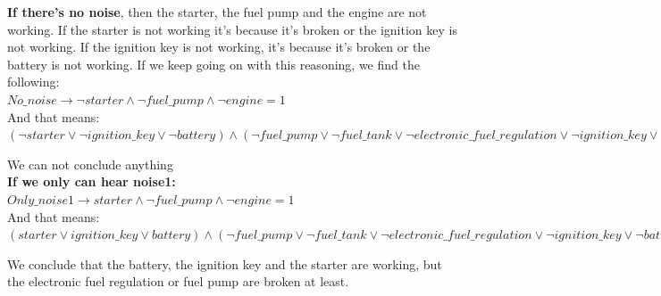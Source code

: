 \documentclass[paper=a4, fontsize=11pt]{scrartcl} %
\numberwithin{equation}{section} %
\numberwithin{figure}{section} %
\numberwithin{table}{section} %
\begin{document}
 \textbf{If there's no noise}, then the starter, the fuel pump and the engine are not working. If the starter is not working it's because it's broken or the ignition key is not working. If the ignition key is not working, it's because it's broken or the battery is not working. If we keep going on with this reasoning, we find the following:\\
		
		$ No\_noise \rightarrow \lnot starter \land \lnot fuel\_pump \land \lnot engine = 1 $\\
		
		And that means: \\
		
		$ (\lnot starter \lor \lnot ignition\_key \lor \lnot battery) \land (\lnot fuel\_pump \lor \lnot fuel\_tank \lor \lnot electronic\_fuel\_regulation \lor \lnot ignition\_key \lor \lnot battery) \land (\lnot engine \lor \lnot filter \lor \lnot fuel\_pump \lor \lnot fuel\_tank \lor \lnot electronic\_fuel\_regulation \lor \lnot ignition\_key \lor \lnot battery \lor \lnot starter \lor \lnot ignition\_key \lor \lnot battery) = 1 $
		
			
		We can not conclude anything\\
		
		
		
		
		
\textbf{If we only can hear noise1:}\\
		
		$ Only\_noise1 \rightarrow  starter \land \lnot fuel\_pump \land \lnot engine = 1 $\\
		
		And that means: \\
		
	$ (starter \lor ignition\_key \lor battery) \land (\lnot fuel\_pump \lor \lnot fuel\_tank \lor \lnot electronic\_fuel\_regulation \lor \lnot ignition\_key \lor \lnot battery) \land (\lnot engine \lor \lnot filter \lor \lnot fuel\_pump \lor \lnot fuel\_tank \lor \lnot electronic\_fuel\_regulation \lor \lnot ignition\_key \lor \lnot battery \lor \lnot starter \lor \lnot ignition\_key \lor \lnot battery) = 1 $
		
		
		We conclude that the battery, the ignition key and the starter are working, but the electronic fuel regulation or fuel pump are broken at least.\\
		
\end{document}
